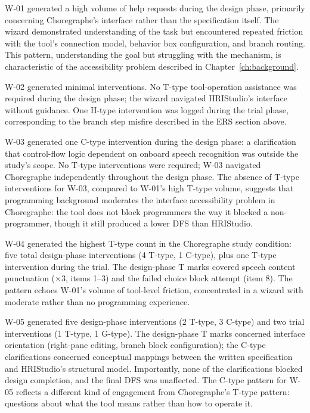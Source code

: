W-01 generated a high volume of help requests during the design phase, primarily concerning Choregraphe's interface rather than the specification itself. The wizard demonstrated understanding of the task but encountered repeated friction with the tool's connection model, behavior box configuration, and branch routing. This pattern, understanding the goal but struggling with the mechanism, is characteristic of the accessibility problem described in Chapter~\ref{ch:background}.

W-02 generated minimal interventions. No T-type tool-operation assistance was required during the design phase; the wizard navigated HRIStudio's interface without guidance. One H-type intervention was logged during the trial phase, corresponding to the branch step misfire described in the ERS section above.

W-03 generated one C-type intervention during the design phase: a clarification that control-flow logic dependent on onboard speech recognition was outside the study's scope. No T-type interventions were required; W-03 navigated Choregraphe independently throughout the design phase. The absence of T-type interventions for W-03, compared to W-01's high T-type volume, suggests that programming background moderates the interface accessibility problem in Choregraphe: the tool does not block programmers the way it blocked a non-programmer, though it still produced a lower DFS than HRIStudio.

W-04 generated the highest T-type count in the Choregraphe study condition: five total design-phase interventions (4 T-type, 1 C-type), plus one T-type intervention during the trial. The design-phase T marks covered speech content punctuation ($\times$3, items 1--3) and the failed choice block attempt (item 8). The pattern echoes W-01's volume of tool-level friction, concentrated in a wizard with moderate rather than no programming experience.

W-05 generated five design-phase interventions (2 T-type, 3 C-type) and two trial interventions (1 T-type, 1 G-type). The design-phase T marks concerned interface orientation (right-pane editing, branch block configuration); the C-type clarifications concerned conceptual mappings between the written specification and HRIStudio's structural model. Importantly, none of the clarifications blocked design completion, and the final DFS was unaffected. The C-type pattern for W-05 reflects a different kind of engagement from Choregraphe's T-type pattern: questions about what the tool means rather than how to operate it.

